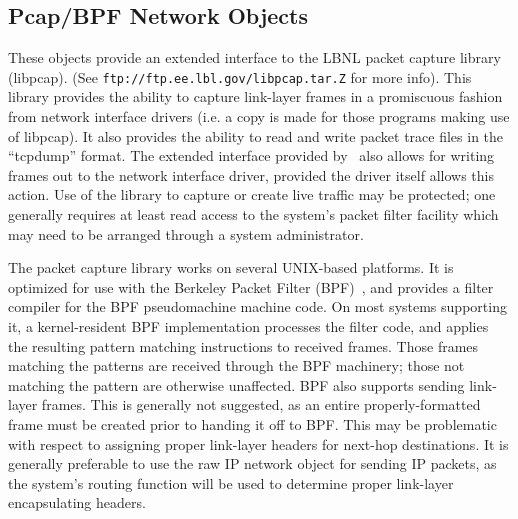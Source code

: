 \subsection{Pcap/BPF Network Objects}

These objects provide an extended interface to the LBNL packet capture
library (libpcap).
(See {\tt ftp://ftp.ee.lbl.gov/libpcap.tar.Z} for more info).
This library provides the ability to capture link-layer frames
in a promiscuous fashion from network interface drivers
(i.e. a copy is made for those programs making use of libpcap).
It also provides the ability to read and write packet trace
files in the ``tcpdump'' format.
The extended interface provided by \ns~also allows for writing
frames out to the network interface driver, provided the driver
itself allows this action.
Use of the library to capture or create live traffic may be protected;
one generally requires at least read access to the system's packet filter
facility which may need to be arranged through a system administrator.

The packet capture library works on several UNIX-based platforms.
It is optimized for use with the
Berkeley Packet Filter (BPF)~\cite{BPF93},
and provides a filter compiler for the BPF pseudomachine machine code.
On most systems supporting it,
a kernel-resident BPF implementation processes the filter code, and 
applies the resulting pattern matching instructions to received frames.
Those frames matching the patterns are received through the BPF machinery;
those not matching the pattern are otherwise unaffected.
BPF also supports sending link-layer frames.
This is generally not suggested, as an entire properly-formatted frame
must be created prior to handing it off to BPF.
This may be problematic with respect to assigning proper link-layer headers
for next-hop destinations.
It is generally preferable to use the raw IP network object for sending
IP packets, as the system's routing function will be used to determine
proper link-layer encapsulating headers.

